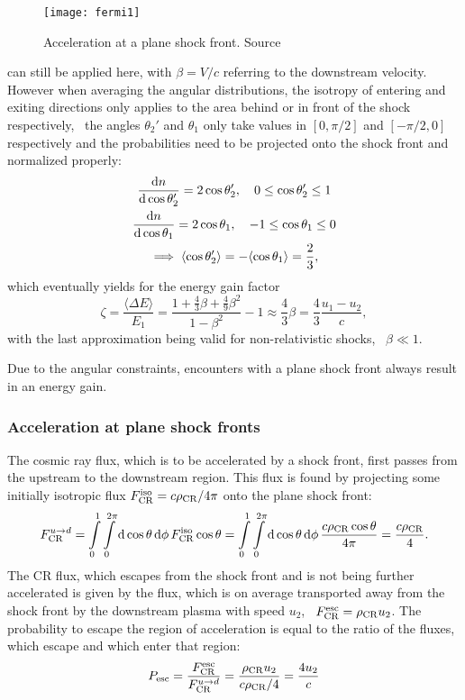 \begin{figure}[ht]
    \centering
    \texttt{[image: fermi1]}
    \caption{Acceleration at a plane shock front. Source\autocite{Gaisser}}
    \label{fig:fermi1}
\end{figure}

 can still be applied here, with $\beta=V/c$ referring to the
downstream velocity. However when averaging the angular distributions, the
isotropy of entering and exiting directions only applies to the area behind or
in front of the shock respectively, \ie~the angles $\theta_2'$ and $\theta_1$
only take values in $[0,\pi/2]$ and $[-\pi/2,0]$ respectively and
the probabilities need to be projected onto the shock front and normalized
properly:
\begin{gather}
    \dv{n}{\cos\theta_2'}=2\cos\theta_2'\qc0\le\cos\theta_2'\le1 \\
    \dv{n}{\cos\theta_1}=2\cos\theta_1\qc-1\le\cos\theta_1\le0 \\
    \implies\langle\cos\theta_2'\rangle=-\langle\cos\theta_1\rangle=\frac{2}{3},
\end{gather}
which eventually yields for the energy gain factor
\begin{equation}
    \zeta=\frac{\langle\Delta{E}\rangle}{E_1}
    =\frac{1+\frac{4}{3}\beta+\frac{4}{9}\beta^2}{1-\beta^2}-1
    \approx\frac{4}{3}\beta=\frac{4}{3}\frac{u_1-u_2}{c},
    \label{eq:gain1}
\end{equation}
with the last approximation being valid for non-relativistic shocks,
\ie~$\beta\ll1$.

Due to the angular constraints, encounters with a plane shock front always
result in an energy gain.


\subsubsection{Acceleration at plane shock fronts}
The cosmic ray flux, which is to be accelerated by a shock front, first passes
from the upstream to the downstream region. This flux is found by projecting
some initially isotropic flux
$F_{\mathrm{CR}}^{\mathrm{iso}}=c\rho_{\mathrm{CR}}/4\pi$ onto the plane shock
front:
\begin{equation}
    F_{\mathrm{CR}}^{u\to{d}}
    =\int\limits_0^1\int\limits_0^{2\pi}\dd{\cos\theta}\dd{\phi}
    F_{\mathrm{CR}}^{\mathrm{iso}}\cos\theta
    =\int\limits_0^1\int\limits_0^{2\pi}\dd{\cos\theta}\dd{\phi}
    \frac{c\rho_{\mathrm{CR}}\cos\theta}{4\pi}
    =\frac{c\rho_{\mathrm{CR}}}{4}.
\end{equation}
The CR flux, which escapes from the shock front and is not being further
accelerated is given by the flux, which is on average transported away from the
shock front by the downstream plasma with speed $u_2$,
\ie~$F_{\mathrm{CR}}^{\mathrm{esc}}=\rho_{\mathrm{CR}}u_2$. The probability to
escape the region of acceleration is equal to the ratio of the fluxes, which
escape and which enter that region:
\begin{equation}
    P_{\mathrm{esc}}=\frac{F_{\mathrm{CR}}^{\mathrm{esc}}}{F_{\mathrm{CR}}^{u\to{d}}}
    =\frac{\rho_{\mathrm{CR}} u_2}{c\rho_{\mathrm{CR}}/4}=\frac{4u_2}{c}
    \label{eq:Pesc}
\end{equation}


